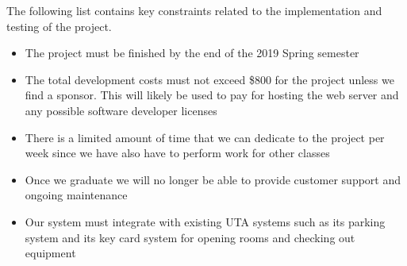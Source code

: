 The following list contains key constraints related to the implementation and testing of the project.

\begin{itemize}
  \item The project must be finished by the end of the 2019 Spring semester
  \item The total development costs must not exceed \$800 for the project unless we find a sponsor. This will likely be used to pay for hosting the web server and any possible software developer licenses
  \item There is a limited amount of time that we can dedicate to the project per week since we have also have to perform work for other classes
  \item Once we graduate we will no longer be able to provide customer support and ongoing maintenance
  \item Our system must integrate with existing UTA systems such as its parking system and its key card system for opening rooms and checking out equipment
\end{itemize}
